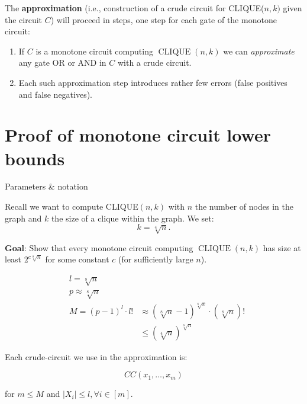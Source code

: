 The \textbf{approximation} (i.e., construction of a crude circuit for CLIQUE(${n},{k})$ given the circuit $C$) will proceed in steps, one step for each gate of the monotone circuit:

\begin{enumerate}
    
\item If $C$ is a monotone circuit computing $\operatorname{CLIQUE}({n}, {k})$ we can \textit{approximate} any gate OR or AND in $C$ with a crude circuit.

\item Each such approximation step introduces rather few errors (false positives and false negatives).
\end{enumerate}


\section{Proof of monotone circuit lower bounds}

\begin{trailer}{Parameters \& notation}

Recall we want to compute CLIQUE$(n, k)$
with $n$ the number of nodes in the graph and $k$ the size of a clique within the graph. 
We set:
$$
k=\sqrt[4]{n}.
$$

\begin{svgraybox}\textbf{Goal}: Show that every monotone circuit computing $\operatorname{CLIQUE}(n,k)$ has size at least $2^{c \sqrt[8]{n}}$ for some constant $c$ (for sufficiently large $n$).
\end{svgraybox}

$$
\begin{aligned}
& l=\sqrt[8]{n} \\
& p \approx \sqrt[8]{n} \\
& M=(p-1)^l \cdot l! & \approx(\sqrt[8]{n}-1)^{\sqrt[8]{x}} \cdot(\sqrt[8]{n})! \\
& & \leq(\sqrt[4]{n})^{\sqrt[8]{n}}
\end{aligned}
$$


Each crude-circuit we use in the approximation is:

$$
C C\left(x_1, \ldots, x_m\right)
$$

for $m \leqslant M$ and $\left|X_i\right| \leqslant l, \forall i \in[m]$.

\end{trailer}

\bigskip 





